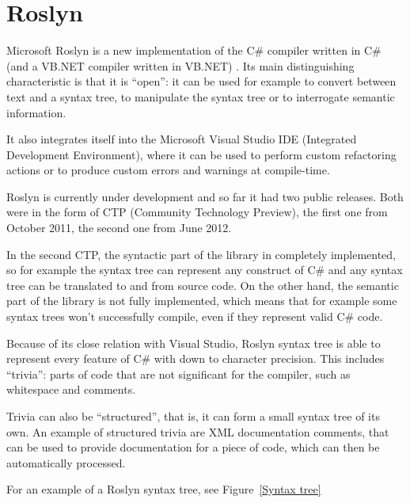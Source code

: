 \section{Roslyn}
\label{roslyn}

Microsoft Roslyn is a new implementation of the C\# compiler written in C\#
(and a VB.NET compiler written in VB.NET) \cite{roslyn}.
Its main distinguishing characteristic is that it is “open”:
it can be used for example to convert between text and a syntax tree,
to manipulate the syntax tree or to interrogate semantic information.

It also integrates itself into the Microsoft Visual Studio IDE
(Integrated Development Environment), where it can be used to perform
custom refactoring actions or to produce custom errors and warnings at compile-time.

Roslyn is currently under development and so far it had two public releases.
Both were in the form of CTP (Community Technology Preview),
the first one from October 2011, the second one from June 2012.

In the second CTP, the syntactic part of the library in completely implemented,
so for example the syntax tree can represent any construct of C\#
and any syntax tree can be translated to and from source code.
On the other hand, the semantic part of the library is not fully implemented,
which means that for example some syntax trees won't successfully compile,
even if they represent valid C\# code.

Because of its close relation with Visual Studio,
Roslyn syntax tree is able to represent every feature of C\# with down to character precision.
This includes “trivia”: parts of code that are not significant for the compiler,
such as whitespace and comments.

Trivia can also be “structured”, that is, it can form a small syntax tree of its own.
An example of structured trivia are XML documentation comments,
that can be used to provide documentation for a piece of code,
which can then be automatically processed.

For an example of a Roslyn syntax tree, see Figure~\ref{Syntax tree}

